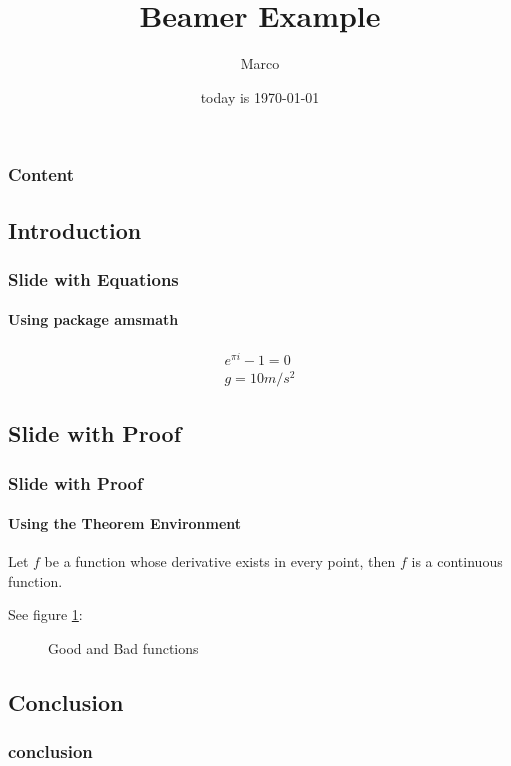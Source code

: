 \documentclass[10pt]{beamer}
\author{Marco}
\title{Beamer Example}
\institute{UZH}
\date{today is \MakeLowercase{\today}}
\begin{document}
	\begin{frame}
		\titlepage
	\end{frame}
	\begin{frame}
		\frametitle{Content}
		\tableofcontents
	\end{frame}
\begin{frame}
\section{Introduction}
\frametitle{Slide with Equations}
\framesubtitle{Using package amsmath}
	\begin{gather}
	  	e^{\pi i}  - 1 = 0 \\
	 	 g = 10 m/s^2
	\end{gather}



\end{frame}
\begin{frame}
\section{Slide with Proof}
\frametitle{Slide with Proof}
\framesubtitle{Using the Theorem Environment}

	\begin{theorem}
	Let \(f\) be a function whose derivative exists in every point, then \(f\) 
	is a continuous function.
	\end{theorem}
	See figure \ref{figure1}:

	\begin{figure}
		\centering 
		\qquad
		\caption{Good and Bad functions}
		\label{figure1}
	\end{figure}

\end{frame}

\begin{frame}
\section{Conclusion}
\frametitle{conclusion}
\end{frame}
\end{document}
